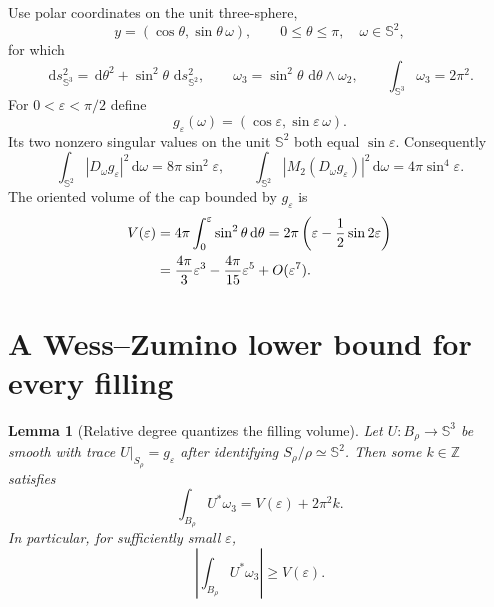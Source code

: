 \documentclass[11pt]{article}
\newtheorem{lemma}[theorem]{Lemma}
\newcommand{\dd}{\,\mathrm d}
\newcommand{\SSS}{\mathbb S}
\begin{document}
Use polar coordinates on the unit three-sphere,
\begin{equation}
 y=(\cos\theta,\sin\theta\,\omega),
 \qquad 0\leq\theta\leq\pi,\quad\omega\in\SSS^2,
 \label{eq:s3polar}
\end{equation}
for which
\begin{equation}
 \dd s^2_{\SSS^3}=\dd\theta^2+\sin^2\theta\,\dd s^2_{\SSS^2},
 \qquad
 \omega_3=\sin^2\theta\,\dd\theta\wedge\omega_2,
 \qquad \int_{\SSS^3}\omega_3=2\pi^2.
 \label{eq:s3metric}
\end{equation}
For $0<\varepsilon<\pi/2$ define
\begin{equation}
 g_\varepsilon(\omega)
   =(\cos\varepsilon,\sin\varepsilon\,\omega).
 \label{eq:trace}
\end{equation}
Its two nonzero singular values on the unit $\SSS^2$ both equal
$\sin\varepsilon$.  Consequently
\begin{equation}
 \int_{\SSS^2}|D_\omega g_\varepsilon|^2\dd\omega
 =8\pi\sin^2\varepsilon,
 \qquad
 \int_{\SSS^2}|M_2(D_\omega g_\varepsilon)|^2\dd\omega
 =4\pi\sin^4\varepsilon.
 \label{eq:trace-norms}
\end{equation}
The oriented volume of the cap bounded by $g_\varepsilon$ is
\begin{align}
 V(\varepsilon)
 &=4\pi\int_0^\varepsilon\sin^2\theta\dd\theta
 =2\pi\left(\varepsilon-\frac12\sin2\varepsilon\right)\notag\\
 &=\frac{4\pi}{3}\varepsilon^3
   -\frac{4\pi}{15}\varepsilon^5+O(\varepsilon^7).
 \label{eq:cap-volume}
\end{align}

\section{A Wess--Zumino lower bound for every filling}

\begin{lemma}[Relative degree quantizes the filling volume]
Let $U:B_\rho\to\SSS^3$ be smooth with trace
$U|_{S_\rho}=g_\varepsilon$ after identifying
$S_\rho/\rho\simeq\SSS^2$.  Then some $k\in\mathbb Z$ satisfies
\begin{equation}
 \int_{B_\rho}U^*\omega_3=V(\varepsilon)+2\pi^2k.
 \label{eq:relative-degree}
\end{equation}
In particular, for sufficiently small $\varepsilon$,
\begin{equation}
 \left|\int_{B_\rho}U^*\omega_3\right|\geq V(\varepsilon).
 \label{eq:wz-distance}
\end{equation}
\end{lemma}
\end{document}
